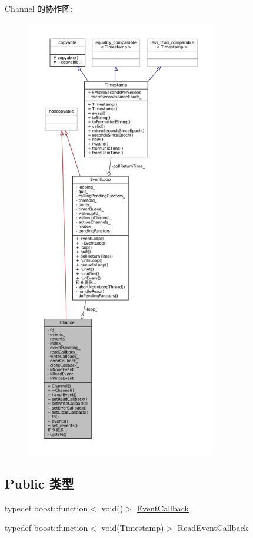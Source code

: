 Channel 的协作图\+:
\nopagebreak
\begin{figure}[H]
\begin{center}
\leavevmode
\includegraphics[height=550pt]{classmuduo_1_1Channel__coll__graph}
\end{center}
\end{figure}
\subsection*{Public 类型}
\begin{DoxyCompactItemize}
\item 
typedef boost\+::function$<$ void()$>$ \hyperlink{classmuduo_1_1Channel_aba4530f63bcce7091a51e66d01f4d2cb}{Event\+Callback}
\item 
typedef boost\+::function$<$ void(\hyperlink{classmuduo_1_1Timestamp}{Timestamp})$>$ \hyperlink{classmuduo_1_1Channel_a9523d5df2fdb848727cf98870dba0000}{Read\+Event\+Callback}
\end{DoxyCompactItemize}

